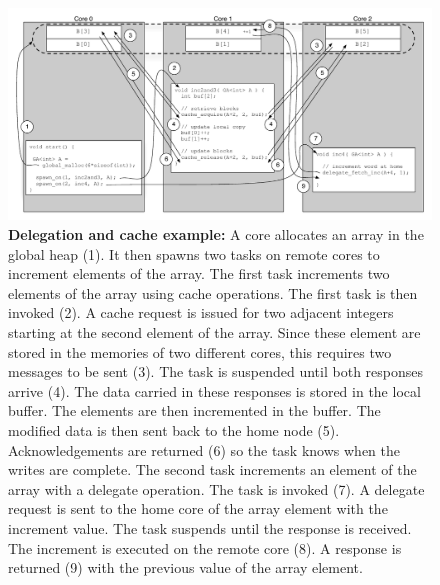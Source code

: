 \begin{figure}[htb] \begin{center}
\includegraphics[width=1.5\columnwidth]{figs/delegate-cache}
\begin{minipage}{1.9\columnwidth} \caption{\label{fig:delegate-cache}
\textbf{Delegation and cache example:} A core allocates an array in the global
heap (1). It then spawns two tasks on remote cores to increment elements of
the array. The first task increments two elements of the array using cache
operations. The first task is then invoked (2). A cache request is issued for two
adjacent integers starting at the second element of the array. Since these
element are stored in the memories of two different cores, this requires two messages to be sent (3). The task is suspended until both responses arrive
(4). The data carried in these responses is stored in the local buffer. The
elements are then incremented in the buffer. The modified data is then sent back
to the home node (5). Acknowledgements are returned (6) so the task
knows when the writes are complete. The second task increments an element of
the array with a delegate operation. The task is invoked (7). A delegate
request is sent to the home core of the array element with the increment
value. The task suspends until the response is received. The increment
is executed on the remote core (8). A response is returned (9) with the
previous value of the array element. } \end{minipage} \vspace{-3ex}
\end{center} \end{figure}


